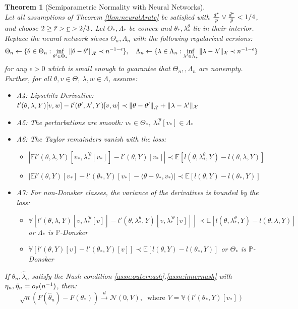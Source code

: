 \documentclass[12pt]{article}
\theoremstyle{myplain}
\newtheorem{theorem}{Theorem}[section]
\theoremstyle{definition}
\theoremstyle{definition}
\theoremstyle{remark}
\numberwithin{equation}{section}
\begin{document}
\begin{theorem}[Semiparametric Normality with Neural Networks]\label{thm:neuralAnormality}\ \\
Let all assumptions of Theorem \ref{thm:neuralArate} be satisfied with $\frac{d^*}{p}\vee\frac{\Bar{d}^*}{\Bar{p}}<1/4$, and choose $2\geq\Bar r>\underline r> 2/3$. Let $\Theta_*, \Lambda_*$ be convex and $\theta_*, \lambda_*^\theta$ lie in their interior. Replace the neural network sieves $\Theta_n,\Lambda_n$ with the following regularized versions:
\[\Theta_n \gets \{\theta \in\Theta_n: \inf_{\theta'\in\Theta_*} \|\theta-\theta'\|_{\Bar {\mathcal{X}}} \prec n^{-1-\epsilon}\},\quad \Lambda_n \gets \{\lambda \in\Lambda_n: \inf_{\lambda'\in\Lambda_*} \|\lambda-\lambda'\|_{{\mathcal{X}}} \prec n^{-1-\epsilon}\}\]
for any $\epsilon>0$ which is small enough to guarantee that $\Theta_n, ,\Lambda_n$ are nonempty. Further, for all $\theta, v\in\Theta,\ \lambda, w\in\Lambda$, assume:
\begin{itemize}[leftmargin=*]
    \item A4: Lipschitz Derivative: $l'(\theta, \lambda, Y)[v,w]-l'(\theta', \lambda', Y)[v,w] \prec \|\theta-\theta'\|_{\Bar {\mathcal{X}}}+\|\lambda-\lambda'\|_{\mathcal{X}}$
    \item A5: The perturbations are smooth: $v_*\in\Theta_*$, $\lambda_*^{\prime\theta}[v_*]\in\Lambda_*$
    \item A6: The Taylor remainders vanish with the loss:
    \begin{itemize}
    \item[i)] $|\mathbb{E}l'(\theta, \lambda, Y)[v_*,\lambda_*^{\prime\theta}[v_*]]-l'(\theta, Y)[v_*]| \prec \mathbb{E}[l(\theta, \lambda_*^\theta, Y)-l(\theta, \lambda, Y)]$
    \item[ii)] $|\mathbb{E}l'(\theta, Y)[v_*]-l'(\theta_*, Y)[v_*]-\langle \theta-\theta_*, v_*\rangle|\prec \mathbb{E}[l(\theta, Y)-l(\theta_*, Y)]$
    \end{itemize}
    \item A7: For non-Donsker classes, the variance of the derivatives is bounded by the loss:
    \begin{itemize}
    \item[i)] $\mathbb{V}[l'(\theta, \lambda, Y)[v, \lambda_*^{\prime\theta}[v]] - l'(\theta, \lambda_*^{\theta}, Y)[v, \lambda_*^{\prime\theta}[v]]] \prec \mathbb{E}[l(\theta, \lambda_*^\theta, Y)-l(\theta, \lambda, Y)]$ or $\Lambda_*$ is $\mathbb{P}$-Donsker
    \item[ii)] $\mathbb{V}[l'(\theta, Y)[v] - l'(\theta_*, Y)[v]] \prec \mathbb{E}[l(\theta, Y)-l(\theta_*, Y)]$ or $\Theta_*$ is $\mathbb{P}$-Donsker
    \end{itemize}
\end{itemize}
If $\widehat{\theta}_n,\widehat{\lambda}_n$ satisfy the Nash condition \ref{assn:outernash},\ref{assn:innernash} with $\eta_n,\Tilde\eta_n=o_\mathbb{P}(n^{-1})$, then:
\[\sqrt{n} \left( F(\widehat{\theta}_n)-F(\theta_*)\right) \overset{d}{\longrightarrow} \mathcal{N}(0, V),\ \text{ where }V=\mathbb{V}\left(l'(\theta_*, Y)[v_*]\right)\]
\end{theorem}
\end{document}
